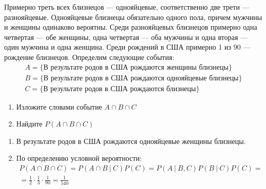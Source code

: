 \documentclass[document]{subfiles}
\begin{document}
\begin{problem}
    Примерно треть всех близнецов --- однояйцевые, соответственно две трети --- разнояйцевые. Однояйцевые близнецы обязательно одного пола, причем мужчины и женщины одинаково вероятны. Среди разнояйцевых близнецов примерно одна четвертая --- обе женщины, одна четвертая --- оба мужчины и одна вторая --- один мужчина и одна женщина. Среди рождений в США примерно 1 из 90 --- рождение близнецов. Определим следующие события:
\begin{gather*}
    A = \{\text{В результате родов в США рождаются женщины близнецы}\} \\
    B = \{\text{В результате родов в США рождаются однояйцевые близнецы}\} \\
    C = \{\text{В результате родов в США рождаются близнецы}\}
\end{gather*}
\begin{enumerate}
    \item Изложите словами событие $A \cap B \cap C$
    \item Найдите $P(A \cap B \cap C)$
\end{enumerate}
\end{problem}
\begin{solution}
    \begin{enumerate}
        \item В результате родов в США рождаются однояйцевые женщины близнецы.
        \item По определению условной вероятности:
            \begin{gather*}
            P(A \cap B \cap C) = P(A \cap B ~|~ C)P(C) = P(A  ~|~ B,C) P(B ~|~ C)P(C) = \\ 
            = \frac{1}{2} \cdot \frac{1}{3} \cdot \frac{1}{90} = \frac{1}{540}
            \end{gather*}
    \end{enumerate}
\end{solution}
\end{document}
